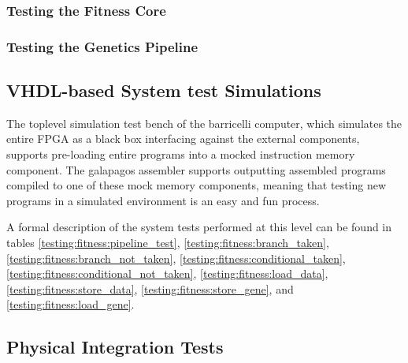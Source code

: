 \subsubsection{Testing the Fitness Core}


\subsubsection{Testing the Genetics Pipeline}


\subsection{\gls{VHDL}-based System test Simulations}
\label{section:testing:fpga:system-tests}

The toplevel simulation test bench of the barricelli computer, which simulates the entire FPGA as a black box interfacing against the external components, supports pre-loading entire programs into a mocked instruction memory component.
The \Gls{galapagos assembler} supports outputting assembled programs compiled to one of these mock memory components, meaning that testing new programs in a simulated environment is an easy and fun process.


A formal description of the system tests performed at this level can be found in tables
\ref{testing:fitness:pipeline_test},
\ref{testing:fitness:branch_taken},
\ref{testing:fitness:branch_not_taken},
\ref{testing:fitness:conditional_taken},
\ref{testing:fitness:conditional_not_taken},
\ref{testing:fitness:load_data},
\ref{testing:fitness:store_data},
\ref{testing:fitness:store_gene},
and
\ref{testing:fitness:load_gene}.












\subsection{Physical Integration Tests}

